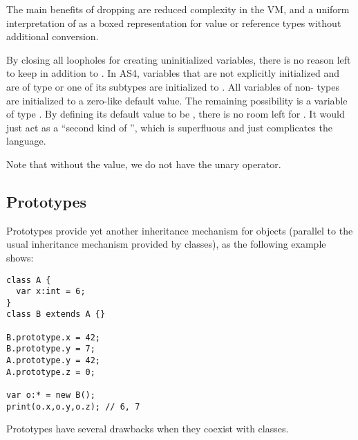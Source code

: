 The main benefits of dropping  are reduced complexity
in the VM, and a uniform interpretation of \code{*} as a boxed
representation for value or reference types without additional conversion.

By closing all loopholes for creating uninitialized variables, there is
no reason left to keep  in addition to . In AS4,
variables that are not explicitly initialized and are of type  or
one of its subtypes are initialized to . All variables of
non- types are initialized to a zero-like default value. The
remaining possibility is a variable of type \code{*}. By defining its default
value to be , there is no room left for . It would
just act as a ``second kind of '', which is superfluous and just
complicates the language.


Note that without the  value, we do not have the unary
 operator.

\subsection{Prototypes}
\label{prototypes}
Prototypes provide yet another inheritance mechanism for objects (parallel to the usual inheritance mechanism provided by classes), as
the following example shows:

\begin{verbatim}
class A {
  var x:int = 6;
}
class B extends A {}

B.prototype.x = 42;
B.prototype.y = 7;
A.prototype.y = 42;
A.prototype.z = 0;

var o:* = new B();
print(o.x,o.y,o.z); // 6, 7
\end{verbatim}

Prototypes have several drawbacks when they coexist with classes.


